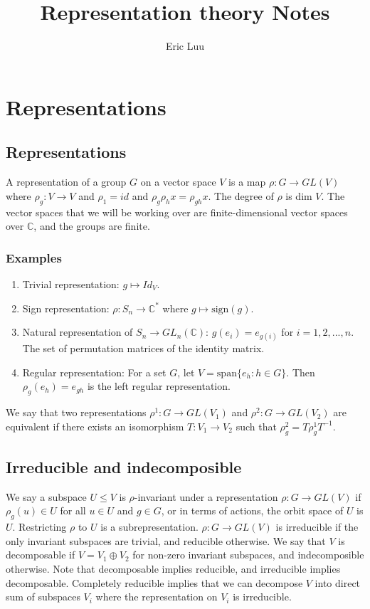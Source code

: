 \documentclass[]{report}
\title{Representation theory Notes}
\author{Eric Luu}
\theoremstyle{definition}
\numberwithin{theorem}{section}
\numberwithin{equation}{section}
\begin{document}
\maketitle
\chapter{Representations}
\section{Representations}
A representation of a group $G$ on a vector space $V$ is a map $\rho : G \rightarrow GL(V)$ where $\rho_{g}: V \rightarrow V$ and $\rho_{1} = id$ and $\rho_{g}\rho_{h} x = \rho_{gh} x$. The degree of $\rho$ is dim $V$. The vector spaces that we will be working over are finite-dimensional vector spaces over $\mathbb{C}$, and the groups are finite.

\subsection{Examples}
\begin{enumerate}
	\item Trivial representation: $g \mapsto Id_V$.
	\item Sign representation: $\rho: S_n \rightarrow \mathbb{C}^*$ where $g \mapsto \text{sign}(g)$. 
	\item Natural representation of $S_n \rightarrow GL_n(\mathbb{C})$:
	$g(e_i) = e_{g(i)}$ for $i = 1, 2, ..., n$. The set of permutation matrices of the identity matrix.
	\item Regular representation: For a set $G$, let $V = \text{span}\lbrace e_h : h \in G \rbrace$. Then $\rho_g(e_h) = e_{gh}$ is the left regular representation.
\end{enumerate}
We say that two representations $\rho^1: G \rightarrow GL(V_1)$ and $\rho^2: G \rightarrow GL(V_2)$ are equivalent if there exists an isomorphism $T: V_1 \rightarrow V_2$ such that $\rho^2_g = T \rho^{1}_g T^{-1}$.
\section{Irreducible and indecomposible}
We say a subspace $U \leq V$ is $\rho$-invariant under a representation $\rho: G \rightarrow GL(V)$ if $\rho_g(u) \in U$ for all $u \in U$ and $g \in G$, or in terms of actions, the orbit space of $U$ is $U$. Restricting $\rho$ to $U$ is a subrepresentation.
$\rho: G \rightarrow GL(V)$ is irreducible if the only invariant subspaces are trivial, and reducible otherwise. We say that $V$ is decomposable if $V = V_1 \oplus V_2$ for non-zero invariant subspaces, and indecomposible otherwise.
Note that decomposable implies reducible, and irreducible implies decomposable. Completely reducible implies that we can decompose $V$ into direct sum of subspaces $V_i$ where the representation on $V_i$ is irreducible. 
\end{document}
